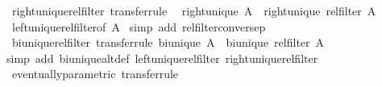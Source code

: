 \begin{isabellebody}
\isanewline
%
\endisadelimproof
\isanewline
{}\isamarkupfalse%
\ right{\isacharunderscore}{\kern0pt}unique{\isacharunderscore}{\kern0pt}rel{\isacharunderscore}{\kern0pt}filter\ {\isacharbrackleft}{\kern0pt}transfer{\isacharunderscore}{\kern0pt}rule{\isacharbrackright}{\kern0pt}{\isacharcolon}{\kern0pt}\isanewline
\ \ {\isachardoublequoteopen}right{\isacharunderscore}{\kern0pt}unique\ A\ {\isasymLongrightarrow}\ right{\isacharunderscore}{\kern0pt}unique\ {\isacharparenleft}{\kern0pt}rel{\isacharunderscore}{\kern0pt}filter\ A{\isacharparenright}{\kern0pt}{\isachardoublequoteclose}\isanewline
%
\isadelimproof
%
\endisadelimproof
%
\isatagproof
{}\isamarkupfalse%
\ left{\isacharunderscore}{\kern0pt}unique{\isacharunderscore}{\kern0pt}rel{\isacharunderscore}{\kern0pt}filter{\isacharbrackleft}{\kern0pt}of\ {\isachardoublequoteopen}A{\isasyminverse}{\isasyminverse}{\isachardoublequoteclose}{\isacharbrackright}{\kern0pt}\ \isamarkupfalse%
{\isacharparenleft}{\kern0pt}simp\ add{\isacharcolon}{\kern0pt}\ rel{\isacharunderscore}{\kern0pt}filter{\isacharunderscore}{\kern0pt}conversep{\isacharparenright}{\kern0pt}%
\endisatagproof
{\isafoldproof}%
%
\isadelimproof
\isanewline
%
\endisadelimproof
\isanewline
{}\isamarkupfalse%
\ bi{\isacharunderscore}{\kern0pt}unique{\isacharunderscore}{\kern0pt}rel{\isacharunderscore}{\kern0pt}filter\ {\isacharbrackleft}{\kern0pt}transfer{\isacharunderscore}{\kern0pt}rule{\isacharbrackright}{\kern0pt}{\isacharcolon}{\kern0pt}\ {\isachardoublequoteopen}bi{\isacharunderscore}{\kern0pt}unique\ A\ {\isasymLongrightarrow}\ bi{\isacharunderscore}{\kern0pt}unique\ {\isacharparenleft}{\kern0pt}rel{\isacharunderscore}{\kern0pt}filter\ A{\isacharparenright}{\kern0pt}{\isachardoublequoteclose}\isanewline
%
\isadelimproof
%
\endisadelimproof
%
\isatagproof
{}\isamarkupfalse%
{\isacharparenleft}{\kern0pt}simp\ add{\isacharcolon}{\kern0pt}\ bi{\isacharunderscore}{\kern0pt}unique{\isacharunderscore}{\kern0pt}alt{\isacharunderscore}{\kern0pt}def\ left{\isacharunderscore}{\kern0pt}unique{\isacharunderscore}{\kern0pt}rel{\isacharunderscore}{\kern0pt}filter\ right{\isacharunderscore}{\kern0pt}unique{\isacharunderscore}{\kern0pt}rel{\isacharunderscore}{\kern0pt}filter{\isacharparenright}{\kern0pt}%
\endisatagproof
{\isafoldproof}%
%
\isadelimproof
\isanewline
%
\endisadelimproof
\isanewline
{}\isamarkupfalse%
\ eventually{\isacharunderscore}{\kern0pt}parametric\ {\isacharbrackleft}{\kern0pt}transfer{\isacharunderscore}{\kern0pt}rule{\isacharbrackright}{\kern0pt}{\isacharcolon}{\kern0pt}\isanewline

\end{isabellebody}
